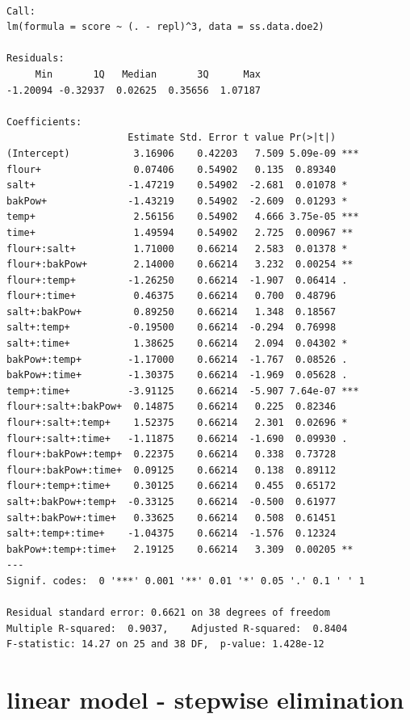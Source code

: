\documentclass[
  a4paper,
]{scrbook}
\begin{document}
\begin{verbatim}

Call:
lm(formula = score ~ (. - repl)^3, data = ss.data.doe2)

Residuals:
     Min       1Q   Median       3Q      Max 
-1.20094 -0.32937  0.02625  0.35656  1.07187 

Coefficients:
                     Estimate Std. Error t value Pr(>|t|)    
(Intercept)           3.16906    0.42203   7.509 5.09e-09 ***
flour+                0.07406    0.54902   0.135  0.89340    
salt+                -1.47219    0.54902  -2.681  0.01078 *  
bakPow+              -1.43219    0.54902  -2.609  0.01293 *  
temp+                 2.56156    0.54902   4.666 3.75e-05 ***
time+                 1.49594    0.54902   2.725  0.00967 ** 
flour+:salt+          1.71000    0.66214   2.583  0.01378 *  
flour+:bakPow+        2.14000    0.66214   3.232  0.00254 ** 
flour+:temp+         -1.26250    0.66214  -1.907  0.06414 .  
flour+:time+          0.46375    0.66214   0.700  0.48796    
salt+:bakPow+         0.89250    0.66214   1.348  0.18567    
salt+:temp+          -0.19500    0.66214  -0.294  0.76998    
salt+:time+           1.38625    0.66214   2.094  0.04302 *  
bakPow+:temp+        -1.17000    0.66214  -1.767  0.08526 .  
bakPow+:time+        -1.30375    0.66214  -1.969  0.05628 .  
temp+:time+          -3.91125    0.66214  -5.907 7.64e-07 ***
flour+:salt+:bakPow+  0.14875    0.66214   0.225  0.82346    
flour+:salt+:temp+    1.52375    0.66214   2.301  0.02696 *  
flour+:salt+:time+   -1.11875    0.66214  -1.690  0.09930 .  
flour+:bakPow+:temp+  0.22375    0.66214   0.338  0.73728    
flour+:bakPow+:time+  0.09125    0.66214   0.138  0.89112    
flour+:temp+:time+    0.30125    0.66214   0.455  0.65172    
salt+:bakPow+:temp+  -0.33125    0.66214  -0.500  0.61977    
salt+:bakPow+:time+   0.33625    0.66214   0.508  0.61451    
salt+:temp+:time+    -1.04375    0.66214  -1.576  0.12324    
bakPow+:temp+:time+   2.19125    0.66214   3.309  0.00205 ** 
---
Signif. codes:  0 '***' 0.001 '**' 0.01 '*' 0.05 '.' 0.1 ' ' 1

Residual standard error: 0.6621 on 38 degrees of freedom
Multiple R-squared:  0.9037,    Adjusted R-squared:  0.8404 
F-statistic: 14.27 on 25 and 38 DF,  p-value: 1.428e-12
\end{verbatim}

\section{linear model - stepwise
elimination}\label{linear-model---stepwise-elimination}
\end{document}
